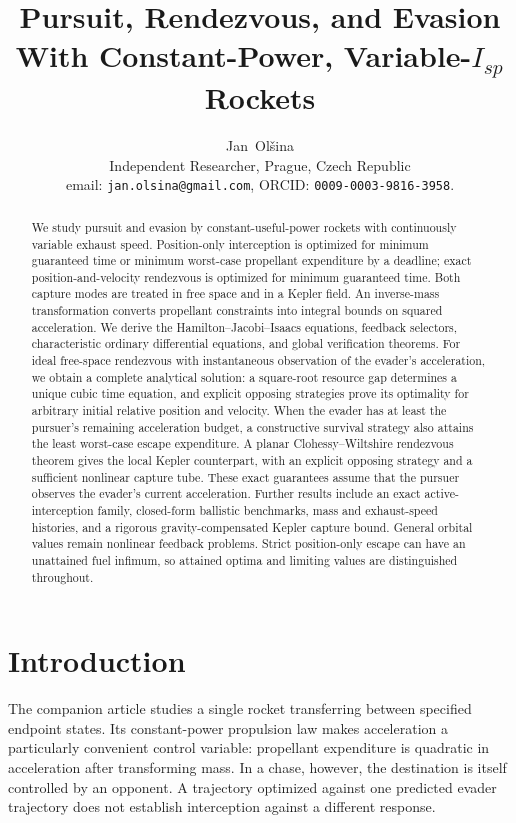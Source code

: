 \documentclass[journal,a4paper]{IEEEtran}
\date{}
\begin{document}
\title{Pursuit, Rendezvous, and Evasion With Constant-Power, Variable-$I_{\!sp}$ Rockets}
\author{Jan~Ol\v{s}ina\\[1ex] Independent Researcher, Prague, Czech Republic\\
email: \texttt{jan.olsina@gmail.com}, ORCID: \texttt{0009-0003-9816-3958}.}
\maketitle

\begin{abstract}
We study pursuit and evasion by constant-useful-power rockets with continuously variable exhaust speed. Position-only interception is optimized for minimum guaranteed time or minimum worst-case propellant expenditure by a deadline; exact position-and-velocity rendezvous is optimized for minimum guaranteed time. Both capture modes are treated in free space and in a Kepler field. An inverse-mass transformation converts propellant constraints into integral bounds on squared acceleration. We derive the Hamilton--Jacobi--Isaacs equations, feedback selectors, characteristic ordinary differential equations, and global verification theorems. For ideal free-space rendezvous with instantaneous observation of the evader's acceleration, we obtain a complete analytical solution: a square-root resource gap determines a unique cubic time equation, and explicit opposing strategies prove its optimality for arbitrary initial relative position and velocity. When the evader has at least the pursuer's remaining acceleration budget, a constructive survival strategy also attains the least worst-case escape expenditure. A planar Clohessy--Wiltshire rendezvous theorem gives the local Kepler counterpart, with an explicit opposing strategy and a sufficient nonlinear capture tube. These exact guarantees assume that the pursuer observes the evader's current acceleration. Further results include an exact active-interception family, closed-form ballistic benchmarks, mass and exhaust-speed histories, and a rigorous gravity-compensated Kepler capture bound. General orbital values remain nonlinear feedback problems. Strict position-only escape can have an unattained fuel infimum, so attained optima and limiting values are distinguished throughout.
\end{abstract}

\section{Introduction}
The companion article \cite{OlsinaCompanion} studies a single rocket transferring between specified endpoint states. Its constant-power propulsion law makes acceleration a particularly convenient control variable: propellant expenditure is quadratic in acceleration after transforming mass. In a chase, however, the destination is itself controlled by an opponent. A trajectory optimized against one predicted evader trajectory does not establish interception against a different response.
\end{document}

